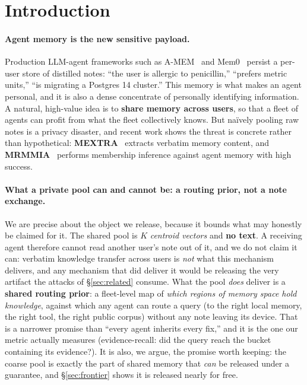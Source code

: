 \documentclass[pdflatex,sn-mathphys-num,iicol]{sn-jnl}
\theoremstyle{thmstyleone}%
\theoremstyle{thmstyletwo}%
\theoremstyle{thmstylethree}%
\newcommand{\secref}[1]{\S\ref{#1}}
\begin{document}

\maketitle

\section{Introduction}\label{sec:intro}

\paragraph{Agent memory is the new sensitive payload.}
Production LLM-agent frameworks such as A-MEM~\cite{xu2024amem} and
Mem0~\cite{chhikara2024mem0} persist a per-user store of distilled notes:
``the user is allergic to penicillin,'' ``prefers metric units,'' ``is migrating
a Postgres 14 cluster.'' This memory is what makes an agent personal, and it is
also a dense concentrate of personally identifying information. A natural,
high-value idea is to \textbf{share memory across users}, so that a fleet of
agents can profit from what the fleet collectively knows. But na\"ively pooling
raw notes is a privacy disaster, and recent work shows the threat is concrete
rather than hypothetical: \textbf{MEXTRA}~\cite{wang2025mextra} extracts verbatim
memory content, and \textbf{MRMMIA}~\cite{chen2026mrmmia} performs membership
inference against agent memory with high success.

\paragraph{What a private pool can and cannot be: a routing prior, not a note
exchange.} We are precise about the object we release, because it bounds what
may honestly be claimed for it. The shared pool is $K$ \emph{centroid vectors}
and \textbf{no text}. A receiving agent therefore cannot read another user's note
out of it, and we do not claim it can: verbatim knowledge transfer across users
is \emph{not} what this mechanism delivers, and any mechanism that did deliver it
would be releasing the very artifact the attacks of \secref{sec:related} consume.
What the pool \emph{does} deliver is a \textbf{shared routing prior}: a
fleet-level map of \emph{which regions of memory space hold knowledge}, against
which any agent can route a query (to the right local memory, the right tool,
the right public corpus) without any note leaving its device. That is a
narrower promise than ``every agent inherits every fix,'' and it is the one our
metric actually measures (evidence-recall: did the query reach the bucket
containing its evidence?). It is also, we argue, the promise worth keeping: the
coarse pool is exactly the part of shared memory that \emph{can} be released
under a guarantee, and \secref{sec:frontier} shows it is released nearly for
free.
\end{document}
